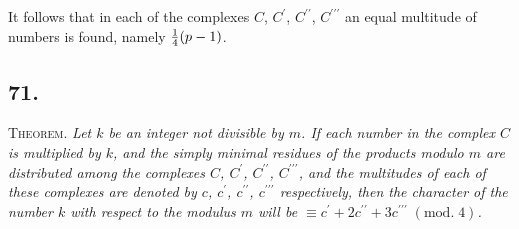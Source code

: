 \documentclass[twoside,12pt]{memoir}
\renewcommand{\pmod}[1]{\;(\textrm{mod.}\;#1)}
\let\oldfrac\frac
\def\frac#1#2{\mathchoice{\tfrac{#1}{#2}}{\oldfrac{#1}{#2}}{\genfrac{}{}{}{2}{#1}{#2\mathstrut}}{\genfrac{}{}{}{3}{#1}{#2\mathstrut}}}
\begin{document}
It follows that in each of the complexes \(C\), \(C^{\prime}\), \(C^{\prime \prime}\), \(C^{\prime \prime \prime}\) an equal multitude of numbers is found, namely \(\frac{1}{4}(p-1)\).
%

\subsection*{71.}
 
\textsc{Theorem.} \textit{Let \(k\) be an integer not divisible by \(m\).  If each number in the complex \(C\) is multiplied by \(k\), and the simply minimal residues of the products modulo \(m\) are distributed among the complexes \(C\), \(C^{\prime}\), \(C^{\prime \prime}\), \(C^{\prime \prime \prime}\), and the multitudes of each of these complexes are denoted by \(c\), \(c^{\prime}\), \(c^{\prime \prime}\), \(c^{\prime \prime \prime}\) respectively, then the character of the number \(k\) with respect to the modulus \(m\) will be \(\equiv c^{\prime}+2 c^{\prime \prime}+3 c^{\prime \prime \prime}\pmod{4}\).}
%
\end{document}
